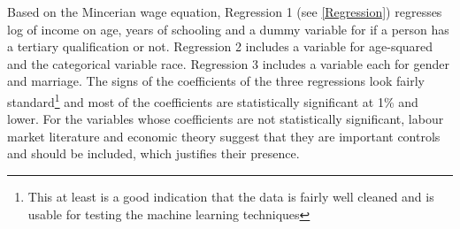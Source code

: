 \documentclass[11pt,preprint, authoryear]{elsarticle}
\numberwithin{equation}{section}
\numberwithin{figure}{section}
\numberwithin{table}{section}
\let\rmarkdownfootnote\footnote%
\def\footnote{\protect\rmarkdownfootnote}
\begin{document}
Based on the Mincerian wage equation, Regression 1 (see
\ref{Regression}) regresses log of income on age, years of schooling and
a dummy variable for if a person has a tertiary qualification or not.
Regression 2 includes a variable for age-squared and the categorical
variable race. Regression 3 includes a variable each for gender and
marriage. The signs of the coefficients of the three regressions look
fairly standard\footnote{This at least is a good indication that the
  data is fairly well cleaned and is usable for testing the machine
  learning techniques} and most of the coefficients are statistically
significant at 1\% and lower. For the variables whose coefficients are
not statistically significant, labour market literature and economic
theory suggest that they are important controls and should be included,
which justifies their presence.

 
  \providecommand{\huxb}[2]{\arrayrulecolor[RGB]{#1}\global\arrayrulewidth=#2pt}
  \providecommand{\huxvb}[2]{\color[RGB]{#1}\vrule width #2pt}
  \providecommand{\huxtpad}[1]{\rule{0pt}{#1}}
  \providecommand{\huxbpad}[1]{\rule[-#1]{0pt}{#1}}
\end{document}
